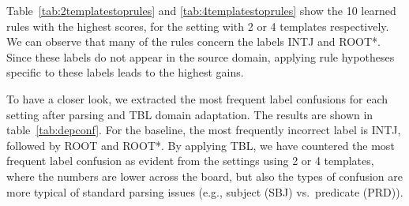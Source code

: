 \begin{table}[t]
\caption{Top learned rules for the setting using 2 templates.}
\label{tab:2templatestoprules}
\end{table}

Table~\ref{tab:2templatestoprules} and \ref{tab:4templatestoprules} show  the 10 learned rules with the highest scores, for the setting with 2 or 4 templates respectively. We can observe that many of the rules concern the labels INTJ and ROOT\textsc{*}. Since these labels do not appear in the source domain, applying rule hypotheses specific to these labels leads to the highest gains. 

To have a closer look, we extracted the most frequent label confusions for each setting after parsing and TBL domain adaptation. The results are shown in table~\ref{tab:depconf}. For the baseline, the most frequently incorrect label is INTJ, followed by ROOT and ROOT\textsc{*}. By applying TBL, we have countered the most frequent label confusion as evident from the settings using 2 or 4 templates, where the numbers are lower across the board, but also the types of confusion are more typical of standard parsing issues (e.g., subject (SBJ) vs.\ predicate (PRD)).


